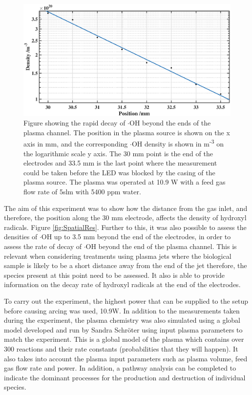 \documentclass[11pt, oneside]{article}   	%
\begin{document}
\begin{figure}
	\centering
	\includegraphics[width=\textwidth]{Figures/OHDecayBig.eps}
	\caption{Figure showing the rapid decay of $\cdot$OH beyond the ends of the plasma channel. The position in the plasma source is shown on the x axis in mm, and the corresponding $\cdot$OH density is shown in m\textsuperscript{-3} on the logarithmic scale y axis. The 30 mm point is the end of the electrodes and 33.5 mm is the last point where the measurement could be taken before the LED was blocked by the casing of the plasma source. The plasma was operated at 10.9 W with a feed gas flow rate of 5slm with 5400 ppm water.}
	\label{fig:OH decay}
\end{figure}

The aim of this experiment was to show how the distance from the gas inlet, and therefore, the position along the 30 mm electrode, affects the density of hydroxyl radicals. Figure \ref{fig:SpatialRes}.
Further to this, it was also possible to assess the densities of $\cdot$OH up to 3.5 mm beyond the end of the electrodes, in order to assess the rate of decay of $\cdot$OH beyond the end of the plasma channel.
This is relevant when considering treatments using plasma jets where the biological sample is likely to be a short distance away from the end of the jet therefore, the species present at this point need to be assessed.
It also is able to provide information on the decay rate of hydroxyl radicals at the end of the electrodes.

To carry out the experiment, the highest power that can be supplied to the setup before causing arcing was used, 10.9W.
In addition to the measurements taken during the experiment, the plasma chemistry was also simulated using a global model developed and run by Sandra Schr\"{o}ter using input plasma parameters to match the experiment.
This is a global model of the plasma which contains over 300 reactions and their rate constants (probabilities that they will happen). It also takes into account the plasma input parameters such as plasma volume, feed gas flow rate and power. In addition, a pathway analysis can be completed to indicate the dominant processes for the production and destruction of individual species.
\end{document}
